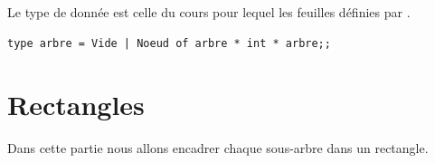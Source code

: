 Le type de donnée est celle du cours pour lequel les feuilles définies par .
\begin{lstlisting}
type arbre = Vide | Noeud of arbre * int * arbre;;
\end{lstlisting}
\section{Rectangles}
Dans cette partie nous allons encadrer chaque sous-arbre dans un rectangle.

